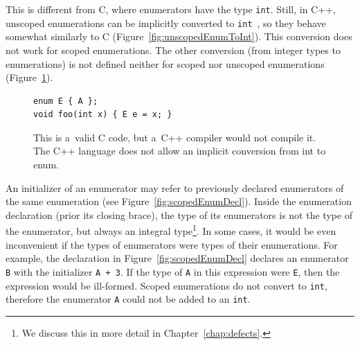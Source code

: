 \documentclass[nolot,nolof,nocover,printed]{fithesis3}
\newcommand{\stdN}[2]{\cite[#2]{#1}\xspace}
\begin{document}
This is different from C, where enumerators have the type \lstinline|int|. Still, in C++, unscoped enumerations can be implicitly converted to \lstinline|int|~\stdN{n4296}{\S 7.2/10}, so they behave somewhat similarly to C (Figure~\ref{fig:unscopedEnumToInt}). This conversion does not work for scoped enumerations. The other conversion (from integer types to enumerations) is not defined neither for scoped nor unscoped enumerations (Figure~\ref{fig:noConversionFromIntToEnum}).

\begin{figure}
\begin{lstlisting}
enum E { A };
void foo(int x) { E e = x; }
\end{lstlisting}
\caption{This is a~valid C code, but a~C++ compiler would not compile it. The C++ language does not allow an implicit conversion from int to enum. }
\label{fig:noConversionFromIntToEnum}
\end{figure}

An initializer of an enumerator may refer to previously declared enumerators of the same enumeration (see Figure~\ref{fig:scopedEnumDecl}). Inside the enumeration declaration (prior its closing brace), the type of its enumerators is not the type of the enumerator, but always an integral type\footnote{We discuss this in more detail in Chapter~\ref{chap:defects}.}.
In some cases, it would be even inconvenient if the types of enumerators were types of their enumerations. For example, the declaration in Figure~\ref{fig:scopedEnumDecl} declares an enumerator \lstinline|B| with the initializer \lstinline|A + 3|. If the type of \lstinline|A| in this expression were \lstinline|E|, then the expression would be ill-formed. Scoped enumerations do not convert to \lstinline|int|, therefore the enumerator \lstinline|A| could not be added to an \lstinline|int|.

%
%
\end{document}

